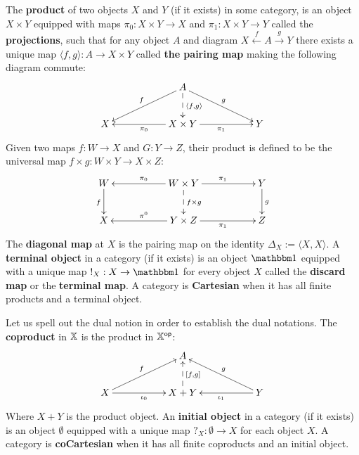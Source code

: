 \begin{definition}
\label{def:cart}
The {\bf product} of two objects $X$ and $Y$ (if it exists) in some category, is an object $X\times Y$ equipped with maps $\pi_0:X\times Y\to X $ and $\pi_1:X\times Y \to Y$ called the {\bf projections},  such that for any object $A$ and diagram  $X \xleftarrow{f} A \xrightarrow{g} Y$ there exists a unique map $\langle  f, g \rangle :A \to X\times Y$ called {\bf the pairing map} making the following diagram commute:
$$
\xymatrix{
    &
    & A \ar[lld]_f \ar[rrd]^g \ar@{-->}[d]^{\langle f,g\rangle}
    &
    &
  \\X 
    &
    & X\times Y \ar[ll]^{\pi_0} \ar[rr]_{\pi_1}
    &
    & Y
}
$$ 
Given two maps $f:W\to X$ and $G:Y\to Z$, their product is defined to be the universal map $f\times g:W\times Y \to X\times Z$: 
$$
\xymatrix{
    W \ar[d]_f
    &
    & W\times Y \ar@{-->}[d]^{f\times g} \ar[ll]_{\pi_0} \ar[rr]^{\pi_1}
    &
    & Y \ar[d]^g
  \\X
    &
    & Y\times Z  \ar[ll]_{\pi^0} \ar[rr]_{\pi_1}
    &
    &Z
}
$$
The {\bf diagonal map} at $X$ is the pairing map on the identity $\Delta_X:=\langle X,X\rangle$.  A {\bf terminal object} in a category (if it exists) is an object $\one$ equipped with a unique map $!_X:X\to \one$ for every object $X$ called the {\bf discard map} or the {\bf terminal map}.
A category is  {\bf Cartesian} when it has all finite products and a terminal object. %





Let us spell out the dual notion in order to establish the dual notations.
The {\bf coproduct} in $\mathbb{X}$ is the product in $\mathbb{X}^{\mathsf{op}}$:
$$
\xymatrix{
    &
    & A
    &
    &
  \\X \ar[urr]^{f} \ar[rr]_{\iota_0}
    &
    & X+  Y \ar@{-->}[u]_{[f,g]} 
    &
    & Y\ar[ull]_{g}  \ar[ll]^{\iota_1}
}
$$ 
Where $ X+  Y $ is the product object. %
An {\bf initial object} in a category (if it exists) is an object $\emptyset$ equipped with a unique map $?_X: \emptyset\to  X$ for each object $X$. %
A category is  {\bf coCartesian} when it has all finite coproducts and an initial object.%
\end{definition}
